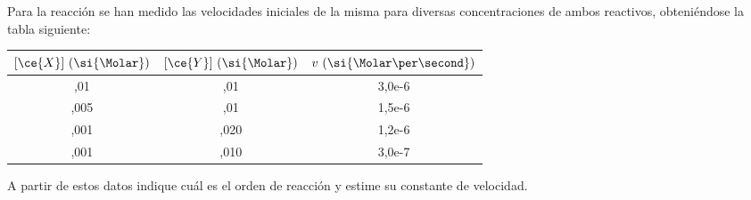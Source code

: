 Para la reacción  se han medido las velocidades iniciales de la misma para diversas concentraciones de ambos reactivos, obteniéndose la tabla siguiente:
\begin{center}
	\begin{tabular}{SSS}
		\toprule
			{$[\ce{X}]~(\si{\Molar})$} & {$[\ce{Y}]~(\si{\Molar})$} & {$v~(\si{\Molar\per\second})$} \\
		\midrule
			,01  & ,01  & 3,0e-6 \\
			,005 & ,01  & 1,5e-6 \\
			,001 & ,020 & 1,2e-6 \\
			,001 & ,010 & 3,0e-7 \\
		\bottomrule
	\end{tabular}
\end{center}
A partir de estos datos indique cuál es el orden de reacción y estime su constante de velocidad.
